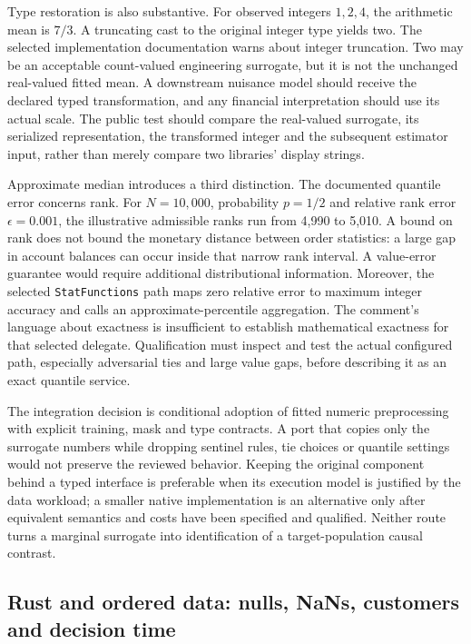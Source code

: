 Type restoration is also substantive. For observed integers $1,2,4$, the arithmetic mean is $7/3$. A truncating cast to the original integer type yields two. The selected implementation documentation warns about integer truncation. Two may be an acceptable count-valued engineering surrogate, but it is not the unchanged real-valued fitted mean. A downstream nuisance model should receive the declared typed transformation, and any financial interpretation should use its actual scale. The public test should compare the real-valued surrogate, its serialized representation, the transformed integer and the subsequent estimator input, rather than merely compare two libraries' display strings.~\citep{exec25_otm_spark,exec25_otm_choice}

Approximate median introduces a third distinction. The documented quantile error concerns rank. For $N=10{,}000$, probability $p=1/2$ and relative rank error $\epsilon=0.001$, the illustrative admissible ranks run from 4,990 to 5,010. A bound on rank does not bound the monetary distance between order statistics: a large gap in account balances can occur inside that narrow rank interval. A value-error guarantee would require additional distributional information. Moreover, the selected \texttt{StatFunctions} path maps zero relative error to maximum integer accuracy and calls an approximate-percentile aggregation. The comment's language about exactness is insufficient to establish mathematical exactness for that selected delegate. Qualification must inspect and test the actual configured path, especially adversarial ties and large value gaps, before describing it as an exact quantile service.~\citep{exec25_otm_spark,exec25_otm_choice}

The integration decision is conditional adoption of fitted numeric preprocessing with explicit training, mask and type contracts. A port that copies only the surrogate numbers while dropping sentinel rules, tie choices or quantile settings would not preserve the reviewed behavior. Keeping the original component behind a typed interface is preferable when its execution model is justified by the data workload; a smaller native implementation is an alternative only after equivalent semantics and costs have been specified and qualified. Neither route turns a marginal surrogate into identification of a target-population causal contrast.~\citep{exec25_otm_spark,exec25_otm_choice}

\subsection{Rust and ordered data: nulls, NaNs, customers and decision time}

